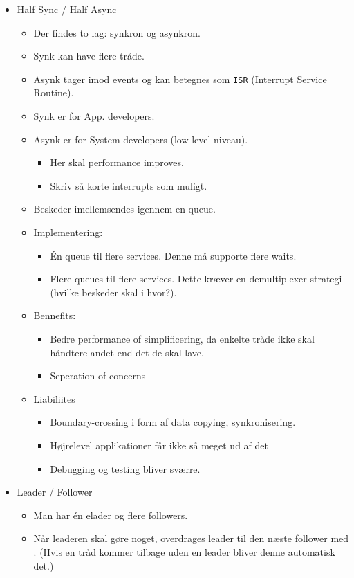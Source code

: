 \documentclass[oneside, 10pt]{memoir}
\begin{document}
\begin{itemize}
	\item Half Sync / Half Async
	
	\begin{itemize}
		\item Der findes to lag: synkron og asynkron.
		
		\item Synk kan have flere tråde.
		
		\item Asynk tager imod events og kan betegnes som \texttt{ISR} (Interrupt Service Routine).
		
		\item Synk er for App. developers.

		\item Asynk er for System developers (low level niveau).
		\begin{itemize}
			\item Her skal performance improves.
			\item Skriv så korte interrupts som muligt.
		\end{itemize}
		
		\item Beskeder imellemsendes igennem en queue.
		
		\item Implementering:
		\begin{itemize}
			\item Én queue til flere services. Denne må supporte flere waits.
			\item Flere queues til flere services. Dette kræver en demultiplexer strategi (hvilke beskeder skal i hvor?).
		\end{itemize}

		\item Bennefits:
		\begin{itemize}
			\item Bedre performance of simplificering, da enkelte tråde ikke skal håndtere andet end det de skal lave.
			\item Seperation of concerns
		\end{itemize}

		\item Liabiliites
		\begin{itemize}
			\item Boundary-crossing i form af data copying, synkronisering.
			\item Højrelevel applikationer får ikke så meget ud af det
			\item Debugging og testing bliver sværre. 
		\end{itemize}
	\end{itemize}


	\item Leader / Follower
	\begin{itemize}
		\item Man har én elader og flere followers.
		\item Når leaderen skal gøre noget, overdrages leader til den næste follower med . (Hvis en tråd kommer tilbage uden en leader bliver denne automatisk det.)
	\end{itemize}

\end{itemize}
\end{document}
